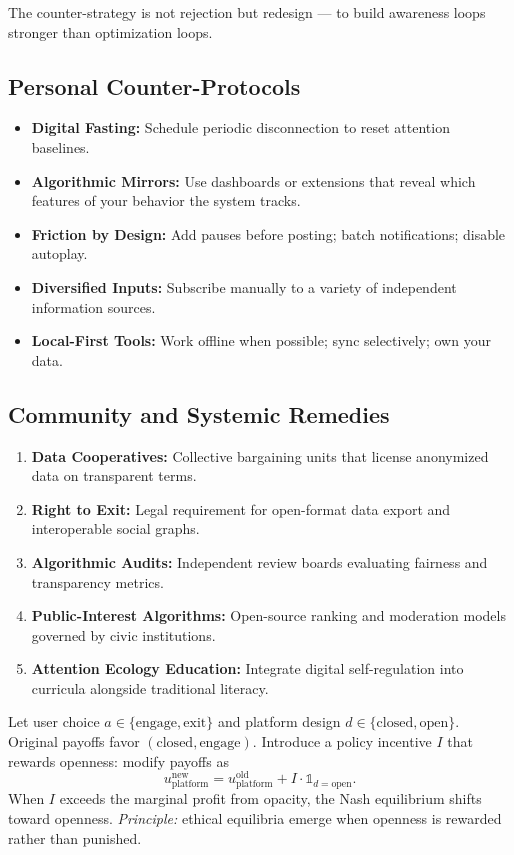 \documentclass[12pt,twoside]{book}
\begin{document}
The counter-strategy is not rejection but redesign — to build awareness loops stronger than optimization loops.

\subsection*{Personal Counter-Protocols}

\begin{itemize}
  \item \textbf{Digital Fasting:} Schedule periodic disconnection to reset attention baselines.
  \item \textbf{Algorithmic Mirrors:} Use dashboards or extensions that reveal which features of your behavior the system tracks.
  \item \textbf{Friction by Design:} Add pauses before posting; batch notifications; disable autoplay.
  \item \textbf{Diversified Inputs:} Subscribe manually to a variety of independent information sources.
  \item \textbf{Local-First Tools:} Work offline when possible; sync selectively; own your data.
\end{itemize}

\subsection*{Community and Systemic Remedies}

\begin{enumerate}[leftmargin=1.2em]
  \item \textbf{Data Cooperatives:} Collective bargaining units that license anonymized data on transparent terms.
  \item \textbf{Right to Exit:} Legal requirement for open-format data export and interoperable social graphs.
  \item \textbf{Algorithmic Audits:} Independent review boards evaluating fairness and transparency metrics.
  \item \textbf{Public-Interest Algorithms:} Open-source ranking and moderation models governed by civic institutions.
  \item \textbf{Attention Ecology Education:} Integrate digital self-regulation into curricula alongside traditional literacy.
\end{enumerate}

\begin{tcolorbox}[colback=gray!5,colframe=gray!60,boxrule=0.4pt,arc=1mm,
title=Mathematical Interlude: Rewriting Payoffs]
Let user choice $a\in\{\text{engage},\text{exit}\}$ and platform design $d\in\{\text{closed},\text{open}\}$.  
Original payoffs favor $(\text{closed},\text{engage})$.  
Introduce a policy incentive $I$ that rewards openness: modify payoffs as  
\[
u_{\text{platform}}^{\text{new}} = u_{\text{platform}}^{\text{old}} + I\cdot\mathbb{1}_{d=\text{open}}.
\]
When $I$ exceeds the marginal profit from opacity, the Nash equilibrium shifts toward openness.  
\textit{Principle:} ethical equilibria emerge when openness is rewarded rather than punished.
\end{tcolorbox}
\end{document}
